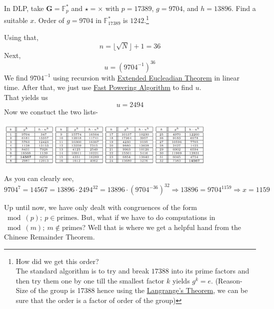 		 \begin{tcolorbox}[breakable, title=Illustration,colback=brown!5!white,colframe=brown!75!black,colbacktitle=yellow!50!red,coltitle=red!25!black,fonttitle=\bfseries,subtitle style={boxrule=0.4pt,colback=yellow!50!red!25!white} ]
		 	In DLP, take \(\mathbf{G}=\mathbb{F}_p^*\) and \(\star=\times\) with \(p = 17389\), \(g= 9704\), and \(h=13896\). Find a suitable \(x\).
		 	\tcblower
		 	Order of \(g=9704\) in \(\mathbb{F}_{17389}^*\) is $1242$.\footnote{How did we get this order? \\The standard algorithm is to try and break \(17388\) into its prime factors and then try them one by one till the smallest factor \(k\) yields $g^k = e$. (Reason- Size of the group is 17388 hence using the \hyperref[theo:LagrangeTheo]{Langrange's Theorem}, we can be sure that the order is a factor of order of the group)}

		 	Using that, \[n = \lfloor\sqrt{N}\rfloor+1= 36\]
		 	Next, \[u=(9704^{-1})^{36}\]
		 	We find \(9704^{-1}\) using recursion with \hyperref[theo:extendedEuclid]{Extended Eucleadian Theorem} in linear time. After that, we just use \hyperref[subsec:fastexpo]{Fast Powering Algorithm} to find \(u\).\\
		 	That yields us \[u = 2494\]
		 	Now we constuct the two lists- 
		 	
		 	\begin{center}
		 		\includegraphics[width=0.8\textwidth]{Photos/DH_2.png}
		 	\end{center}

		 	As you can clearly see, \[9704^7=14567=13896 \cdot 2494^{32}= 13896 \cdot (9704^{-36})^{32}\Rightarrow13896= 9704^{1159}\Rightarrow x=1159\]
		 \end{tcolorbox}

		Up until now, we have only dealt with congruences of the form \(\bmod(p); \: p \in \text{primes}\). But, what if we have to do computations in \(\bmod(m);\: m \not\in \text{primes}\)? Well that is where we get a helpful hand from the Chinese Remainder Theorem.
		
